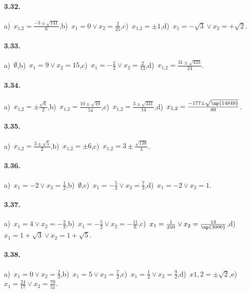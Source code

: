 \paragraph{3.32.} a)~$x_{1\text{,}2} = \frac{- 3 \pm \sqrt{141}}{6}$,\quad b)~$x_{1} = 0 \vee x_{2} = \frac{2}{25}$,\quad c)~$x_{1\text{,}2} =\pm 1$,\quad d)~$x_{1} =-\sqrt{3} \vee x_{2} = + \sqrt{2}$.

\paragraph{3.33.} a)~$\emptyset$,\quad b)~$x_{1} = 9 \vee x_{2} = 15$,\quad c)~$x_{1} =-\frac{2}{3} \vee x_{2} = \frac{2}{13}$,\quad d)~$x_{1\text{,}2} = \frac{31 \pm \sqrt{433}}{24}$.

\paragraph{3.34.} a)~$x_{1\text{,}2} = \pm \frac{\sqrt{6}}{2}$,\quad b)~$x_{1\text{,}2} = \frac{10 \pm \sqrt{10}}{54}$,\quad c)~$x_{1\text{,}2} = \frac{3 \pm \sqrt{331}}{14}$,\quad d)~$x_{1\text{,}2} = \frac{- 177 \pm \sqrt{\np{14849}}}{80}$.

\paragraph{3.35.} a)~$x_{1\text{,}2} = \frac{3 \pm \sqrt{5}}{2}$,\quad b)~$x_{1\text{,}2} =\pm 6$,\quad c)~$x_{1\text{,}2} = 3 \pm \frac{\sqrt{138}}{4}$.

\paragraph{3.36.} a)~$x_{1} =-2 \vee x_{2} = \frac{1}{2}$,\quad b)~$\emptyset$,\quad c)~$x_1=-\frac{5}{3} \vee x_2=\frac{7}{3}$,\quad d)~$x_1=-2 \vee x_2=1$.

\paragraph{3.37.} a)~$x_{1} = 4 \vee x_{2} =-\frac{2}{3}$,\quad b)~$x_{1} =-\frac{5}{2} \vee x_{2} =-\frac{11}{6}$,\quad c)~$x_{1} =\frac{1}{250} \vee x_{2} =\frac{13}{\np{3000}}$,\quad d)~$x_{1} = 1 + \sqrt{3} \vee x_{2} = 1 + \sqrt{5}$.

\paragraph{3.38.} a)~$x_{1} =0 \vee x_{2} =\frac{2}{3}$,\quad b)~$x_{1} = 5 \vee x_{2} = \frac{7}{2}$,\quad c)~$x_{1} =\frac{1}{2} \vee x_{2} =\frac{9}{2}$,\quad d)~$x{1,2}= \pm \sqrt{2}$,\quad e)~$x_{1} = \frac{24}{17} \vee x_{2} = \frac{70}{51}$.

